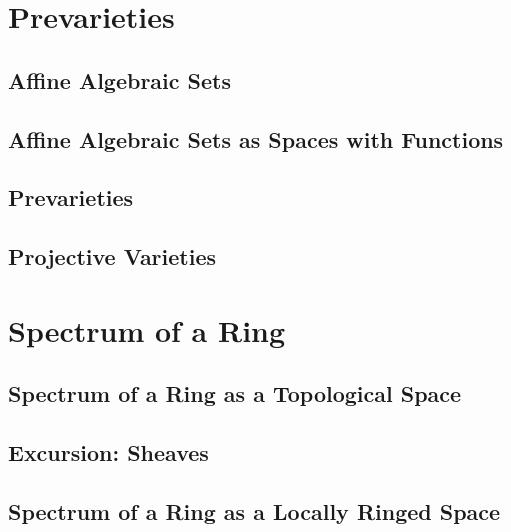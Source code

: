 \documentclass[11pt, a4paper]{article}
\title{\notestitle}
\author{\notesauthor}
\date{\notesdate}
\begin{document}
\maketitle
\tableofcontents
\newpage

\section{Prevarieties}

\subsection{Affine Algebraic Sets}

\subsection{Affine Algebraic Sets as Spaces with Functions}

\subsection{Prevarieties}

\subsection{Projective Varieties}

\section{Spectrum of a Ring}

\subsection{Spectrum of a Ring as a Topological Space}

\subsection{Excursion: Sheaves}

\subsection{Spectrum of a Ring as a Locally Ringed Space}
\end{document}
